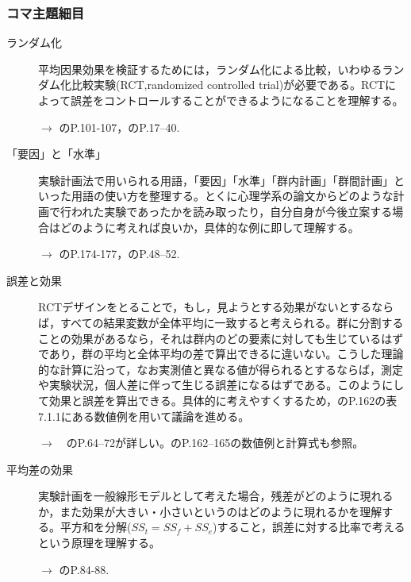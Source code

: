 \subsubsection{コマ主題細目}
\begin{description}
	\item[ランダム化]平均因果効果を検証するためには，ランダム化による比較，いわゆるランダム化比較実験(RCT,randomized controlled trial)が必要である。RCTによって誤差をコントロールすることができるようになることを理解する。
	      \begin{flushright}
		      $\to$ \textcite{Nishiuchi201301}のP.101-107，\textcite{Ohmura201301}のP.17--40.
	      \end{flushright}

	\item[「要因」と「水準」]実験計画法で用いられる用語，「要因」「水準」「群内計画」「群間計画」といった用語の使い方を整理する。とくに心理学系の論文からどのような計画で行われた実験であったかを読み取ったり，自分自身が今後立案する場合はどのように考えれば良いか，具体的な例に即して理解する。
	      \begin{flushright}
		      $\to$ \textcite{Yamada2004}のP.174-177，\textcite{Ohmura201301}のP.48--52.
	      \end{flushright}

	\item[誤差と効果]RCTデザインをとることで，もし，見ようとする効果がないとするならば，すべての結果変数が全体平均に一致すると考えられる。群に分割することの効果があるなら，それは群内のどの要素に対しても生じているはずであり，群の平均と全体平均の差で算出できるに違いない。こうした理論的な計算に沿って，なお実測値と異なる値が得られるとするならば，測定や実験状況，個人差に伴って生じる誤差になるはずである。このようにして効果と誤差を算出できる。具体的に考えやすくするため，\textcite{Yamada2004}のP.162の表7.1.1にある数値例を用いて議論を進める。
	      \begin{flushright}
		      $\to$　\textcite{Ohmura201301}のP.64--72が詳しい。\textcite{Yamada2004}のP.162--165の数値例と計算式も参照。
	      \end{flushright}

	\item[平均差の効果]実験計画を一般線形モデルとして考えた場合，残差がどのように現れるか，また効果が大きい・小さいというのはどのように現れるかを理解する。平方和を分解($SS_t = SS_f+SS_e$)すること，誤差に対する比率で考えるという原理を理解する。
	      \begin{flushright}
		      $\to$ \textcite{Ohmura201301}のP.84-88.
	      \end{flushright}


\end{description}
